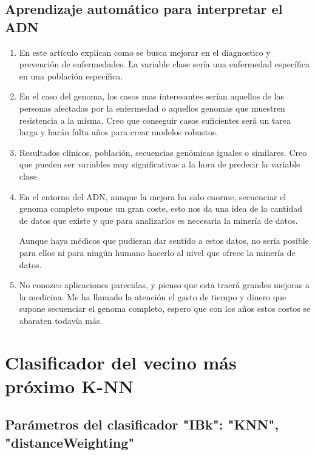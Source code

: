 \documentclass[es]{ifirak}
\begin{document}
\subsection{Aprendizaje automático para interpretar el ADN}
\begin{enumerate}

\item  En este artículo explican como se busca mejorar en el diagnostico y prevención de enfermedades. La variable clase sería una enfermedad específica en una población específica.

\item  En el caso del genoma, los casos mas interesantes serían aquellos de 	las personas afectadas por la enfermedad o aquellos genomas que muestren resistencia a la misma. Creo que conseguir casos suficientes será un tarea larga y harán falta años para crear modelos robustos.

\item  Resultados clínicos, población, secuencias genómicas iguales o similares. Creo que pueden ser variables muy significativas a la hora de predecir la variable clase.

\item  En el entorno del ADN, aunque la mejora ha sido enorme, secuenciar el 	genoma completo supone un gran coste, esto nos da una idea de la cantidad de datos que existe y que para analizarlos es necesaria la minería de datos. 

Aunque haya médicos que pudieran dar sentido a estos datos, no sería posible para ellos ni para ningún humano hacerlo al nivel que ofrece la minería de datos.

\item  No conozco aplicaciones parecidas, y pienso que esta traerá grandes mejoras a la medicina. Me ha llamado la atención el gasto de tiempo y dinero que supone secuenciar el genoma completo, espero que con los años estos costos se abaraten todavía más.   

\end{enumerate}


\section{ Clasificador del vecino más próximo K-NN }



\subsection{Parámetros del clasificador "IBk": "KNN", "distanceWeighting"} 
\end{document}
